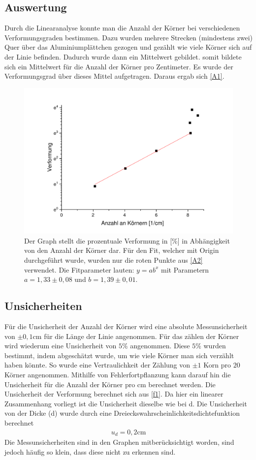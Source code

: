 \documentclass[
	a4paper,
	12pt,
	pagesize,
	ngerman
]{scrartcl}
\begin{document}
\subsection{Auswertung}
Durch die Linearanalyse konnte man die Anzahl der Körner bei verschiedenen Verformungsgraden bestimmen. Dazu wurden mehrere Strecken (mindestens zwei) Quer über das Aluminiumplättchen gezogen und gezählt wie viele Körner sich auf der Linie befinden. Dadurch wurde dann ein Mittelwert gebildet. somit bildete sich ein Mittelwert für die Anzahl der Körner pro Zentimeter. Es wurde der Verformungsgrad über dieses Mittel aufgetragen.
Daraus ergab sich \cref{A1}.
\begin{figure}[h!]    \includegraphics[scale = 0.6]{fitfit.pdf}
    \caption{Der Graph stellt die prozentuale Verformung in [\%] in Abhängigkeit von den Anzahl der Körner dar. Für den Fit, welcher mit Origin durchgeführt wurde, wurden nur die roten Punkte aus \cref{A2} verwendet. Die Fitparameter lauten:
    $y=ab^x$ mit Parametern $a=1,33\pm 0,08$ und $b = 1,39 \pm 0,01$.}
    \label{A3}
\end{figure}

\subsection{Unsicherheiten}
Für die Unsicherheit der Anzahl der Körner wird eine absolute Messunsicherheit von $\pm 0,1$cm für die Länge der Linie angenommen. Für das zählen der Körner  wird wiederum eine Unsicherheit von $5\%$ angenommen. Diese $5\%$ wurden bestimmt, indem abgeschätzt wurde, um wie viele Körner man sich verzählt haben könnte. So wurde eine Vertraulichkeit der Zählung von $\pm 1$ Korn pro $20$ Körner angenommen. Mithilfe von Fehlerfortpflanzung kann darauf hin die Unsicherheit für die Anzahl der Körner pro cm berechnet werden. 
Die Unsicherheit der Verformung berechnet sich aus \cref{f1}.
Da hier ein linearer Zusammenhang vorliegt ist die Unsicherheit dieselbe wie bei d. Die Unsicherheit von der Dicke (d) wurde durch eine Dreieckswahrscheinlichkeitsdichtefunktion berechnet 
\begin{align*}
    u_d = 0,2\text{cm}
\end{align*}
Die Messunsicherheiten sind in den Graphen mitberücksichtigt worden, sind jedoch häufig so klein, dass diese nicht zu erkennen sind.
\end{document}
